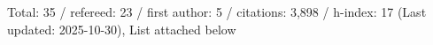 Total: 35 / refereed: 23 / first author: 5 / citations: 3,898 / h-index: 17 (Last updated: 2025-10-30), List attached below